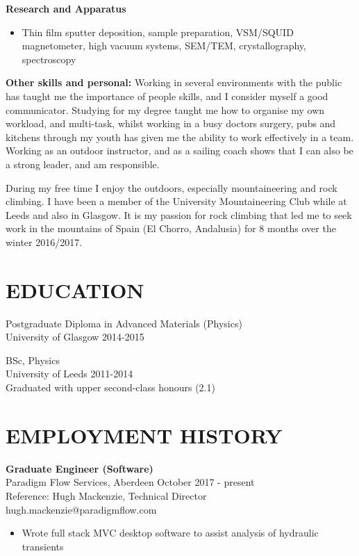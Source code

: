 \documentclass[margin, line, 10pt]{res} %
\begin{document}
\begin{resume}
\textbf{Research and Apparatus} 
\begin{itemize}
\item Thin film sputter deposition, sample preparation, VSM/SQUID magnetometer, high vacuum systems, SEM/TEM, crystallography, spectroscopy
\end{itemize}

\textbf{Other skills and personal:}
Working in several environments with the public has taught me the importance of  people skills, and I consider myself a good communicator. Studying for my degree taught me how to organise my own workload, and multi-task, whilst working in a busy doctors surgery, pubs and kitchens through my youth has given me the ability to work effectively in a team. Working as an outdoor instructor, and as a sailing coach shows that I can also be a strong leader, and am responsible.\

During my free time I enjoy the outdoors, especially mountaineering and rock climbing. I have been a member of the University Mountaineering Club while at Leeds and also in Glasgow. It is my passion for rock climbing that led me to seek work in the mountains of Spain (El Chorro, Andalusia) for 8 months over the winter 2016/2017.

\section{EDUCATION}

Postgraduate Diploma in Advanced Materials (Physics)\\
University of Glasgow 2014-2015 \

BSc, Physics \\
University of Leeds 2011-2014 \\
Graduated with upper second-class honours (2.1) 

\section{EMPLOYMENT HISTORY}

\textbf{Graduate Engineer (Software)} \\
Paradigm Flow Services, Aberdeen \hfill October 2017 - present\\
Reference: Hugh Mackenzie, Technical Director\\
hugh.mackenzie@paradigmflow.com \\
\begin{itemize}

\item Wrote full stack MVC desktop software to assist analysis of hydraulic transients


\end{itemize}
\end{resume}
\end{document}
